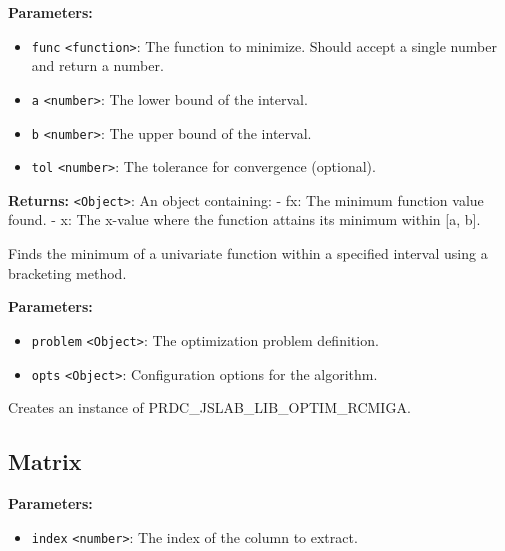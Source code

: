 \documentclass[12pt,a4paper]{article}
\begin{document}
\noindent \textbf{Parameters:}
\begin{itemize}
  \item \texttt{func} \texttt{<function>}: The function to minimize. Should accept a single number and return a number.
  \item \texttt{a} \texttt{<number>}: The lower bound of the interval.
  \item \texttt{b} \texttt{<number>}: The upper bound of the interval.
  \item \texttt{tol} \texttt{<number>}: The tolerance for convergence (optional).
\end{itemize}

\noindent \textbf{Returns:} \texttt{<Object>}: An object containing:
  - \textasciigrave{}fx\textasciigrave{}: The minimum function value found.
  - \textasciigrave{}x\textasciigrave{}: The x-value where the function attains its minimum within [a, b].

\noindent Finds the minimum of a univariate function within a specified interval using a bracketing method.

\vspace{5mm}
\noindent {}


\noindent \textbf{Parameters:}
\begin{itemize}
  \item \texttt{problem} \texttt{<Object>}: The optimization problem definition.
  \item \texttt{opts} \texttt{<Object>}: Configuration options for the algorithm.
\end{itemize}

\noindent Creates an instance of PRDC\_JSLAB\_LIB\_OPTIM\_RCMIGA.


\subsection{Matrix}
\vspace{5mm}
\noindent {}


\noindent \textbf{Parameters:}
\begin{itemize}
  \item \texttt{index} \texttt{<number>}: The index of the column to extract.
\end{itemize}
\end{document}
